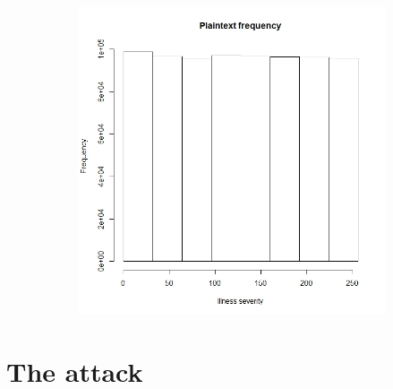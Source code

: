 \documentclass{article}
\begin{document}
\begin{itemize}
\begin{figure}[H]
\begin{subfigure}{.45\textwidth}
			\includegraphics[width=1\linewidth]{./Img/img2.jpeg}
		\end{subfigure}
	\end{figure}
\end{itemize}


\section{The attack}
\end{document}
